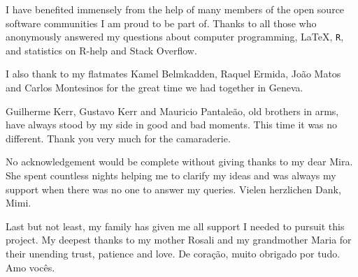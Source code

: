 I have benefited immensely from the help of many members of the open source software communities I am proud to be part of. Thanks to all those who anonymously answered my questions about computer programming, \LaTeX, \texttt{R}, and statistics on R-help and Stack Overflow. 

I also thank to my flatmates Kamel Belmkadden, Raquel Ermida, Jo\~{a}o Matos and Carlos Montesinos for the great time we had together in Geneva.

Guilherme Kerr, Gustavo Kerr and Mauricio Pantale\~{a}o, old brothers in arms, have always stood by my side in good and bad moments. This time it was no different. Thank you very much for the camaraderie. 

No acknowledgement would be complete without giving thanks to my dear Mira. She spent countless nights helping me to clarify my ideas and was always my support when there was no one to answer my queries. Vielen herzlichen Dank, Mimi.

Last but not least, my family has given me all support I needed to pursuit this project. My deepest thanks to my mother Rosali and my grandmother Maria for their unending trust, patience and love. De cora\c{c}\~{a}o, muito obrigado por tudo. Amo voc\^{e}s.








\endgroup